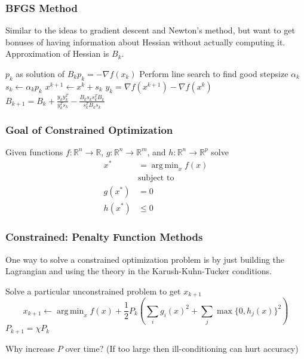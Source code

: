 \documentclass[10pt]{beamer}
\DeclareMathOperator*{\argmin}{arg\,min}
\begin{document}
\begin{frame} \frametitle{BFGS Method}

  Similar to the ideas to gradient descent and Newton's method, but want to get bonuses of having information about Hessian without actually computing it. Approximation of Hessian is $B_k$.

  \vspace{0.5cm}

  \begin{algorithmic}

    \STATE $p_k$ as solution of $B_k p_k = - \nabla f(x_k)$
    \STATE Perform line search to find good stepsize $\alpha_k$
    \STATE $s_k \leftarrow \alpha_k p_k$
    \STATE $x^{k+1} \leftarrow x^k + s_k$
    \STATE $y_k = \nabla f(x^{k+1}) - \nabla f(x^k)$
    \STATE $B_{k+1} = B_k + \frac{y_k y_k^T}{y_k^T s_k} - \frac{B_k s_k s_k^T B_k}{s_k^T B_k s_k}$
    \ENDWHILE

  \end{algorithmic}

\end{frame}

\begin{frame} \frametitle{Goal of Constrained Optimization}

  Given functions $f: \mathbb{R}^n \rightarrow \mathbb{R}$, $g: \mathbb{R}^n \rightarrow \mathbb{R}^m$, and $h: \mathbb{R}^n \rightarrow \mathbb{R}^p$ solve
  \begin{align*}
    x^* &= \argmin_x f(x) \\
        &\text{subject to } \\
        g(x^*) &= 0 \\
        h(x^*) &\leq 0
    \end{align*}

\end{frame}

\begin{frame} \frametitle{Constrained: Penalty Function Methods}

  One way to solve a constrained optimization problem is by just building the Lagrangian and using the theory in the Karush-Kuhn-Tucker conditions.

  \vspace{0.5cm}

  \begin{algorithmic}

    \STATE Solve a particular unconstrained problem to get $x_{k+1}$
    $$x_{k+1} \leftarrow \argmin_x f(x) + \frac{1}{2} P_k \left( \sum_i g_i(x)^2 + \sum_j \max \{0, h_j(x) \}^2 \right)$$
    \STATE $P_{k+1} = \chi P_{k}$
    \ENDWHILE

  \end{algorithmic}

  \vspace{0.5cm}

  Why increase $P$ over time? (If too large then ill-conditioning can hurt accuracy)

\end{frame}
\end{document}
